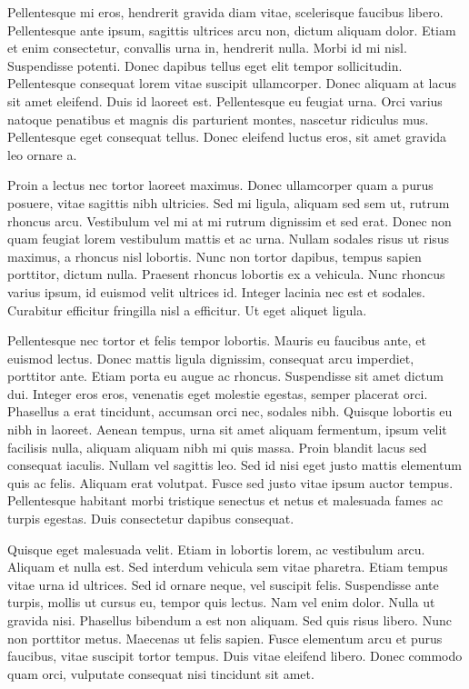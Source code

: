 \documentclass{article}
\begin{document}
Pellentesque mi eros, hendrerit gravida diam vitae, scelerisque faucibus libero. Pellentesque ante ipsum, sagittis ultrices arcu non, dictum aliquam dolor. Etiam et enim consectetur, convallis urna in, hendrerit nulla. Morbi id mi nisl. Suspendisse potenti. Donec dapibus tellus eget elit tempor sollicitudin. Pellentesque consequat lorem vitae suscipit ullamcorper. Donec aliquam at lacus sit amet eleifend. Duis id laoreet est. Pellentesque eu feugiat urna. Orci varius natoque penatibus et magnis dis parturient montes, nascetur ridiculus mus. Pellentesque eget consequat tellus. Donec eleifend luctus eros, sit amet gravida leo ornare a.

Proin a lectus nec tortor laoreet maximus. Donec ullamcorper quam a purus posuere, vitae sagittis nibh ultricies. Sed mi ligula, aliquam sed sem ut, rutrum rhoncus arcu. Vestibulum vel mi at mi rutrum dignissim et sed erat. Donec non quam feugiat lorem vestibulum mattis et ac urna. Nullam sodales risus ut risus maximus, a rhoncus nisl lobortis. Nunc non tortor dapibus, tempus sapien porttitor, dictum nulla. Praesent rhoncus lobortis ex a vehicula. Nunc rhoncus varius ipsum, id euismod velit ultrices id. Integer lacinia nec est et sodales. Curabitur efficitur fringilla nisl a efficitur. Ut eget aliquet ligula.

Pellentesque nec tortor et felis tempor lobortis. Mauris eu faucibus ante, et euismod lectus. Donec mattis ligula dignissim, consequat arcu imperdiet, porttitor ante. Etiam porta eu augue ac rhoncus. Suspendisse sit amet dictum dui. Integer eros eros, venenatis eget molestie egestas, semper placerat orci. Phasellus a erat tincidunt, accumsan orci nec, sodales nibh. Quisque lobortis eu nibh in laoreet. Aenean tempus, urna sit amet aliquam fermentum, ipsum velit facilisis nulla, aliquam aliquam nibh mi quis massa. Proin blandit lacus sed consequat iaculis. Nullam vel sagittis leo. Sed id nisi eget justo mattis elementum quis ac felis. Aliquam erat volutpat. Fusce sed justo vitae ipsum auctor tempus. Pellentesque habitant morbi tristique senectus et netus et malesuada fames ac turpis egestas. Duis consectetur dapibus consequat.

Quisque eget malesuada velit. Etiam in lobortis lorem, ac vestibulum arcu. Aliquam et nulla est. Sed interdum vehicula sem vitae pharetra. Etiam tempus vitae urna id ultrices. Sed id ornare neque, vel suscipit felis. Suspendisse ante turpis, mollis ut cursus eu, tempor quis lectus. Nam vel enim dolor. Nulla ut gravida nisi. Phasellus bibendum a est non aliquam. Sed quis risus libero. Nunc non porttitor metus. Maecenas ut felis sapien. Fusce elementum arcu et purus faucibus, vitae suscipit tortor tempus. Duis vitae eleifend libero. Donec commodo quam orci, vulputate consequat nisi tincidunt sit amet.
\end{document}
